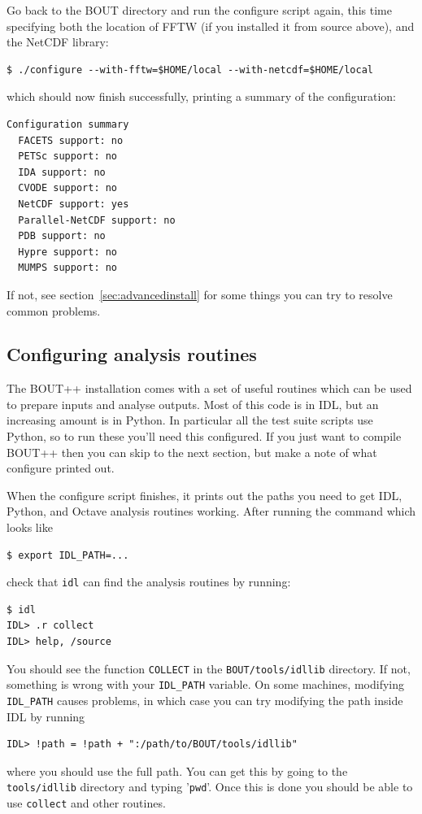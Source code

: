 \documentclass[12pt]{article}
\begin{document}
Go back to the BOUT directory and run the configure script again, 
this time specifying both the location of FFTW (if you installed it 
from source above), and the NetCDF library:
\begin{verbatim}
$ ./configure --with-fftw=$HOME/local --with-netcdf=$HOME/local
\end{verbatim}

which should now finish successfully, printing a summary of the configuration:
\begin{verbatim}
Configuration summary
  FACETS support: no
  PETSc support: no
  IDA support: no
  CVODE support: no
  NetCDF support: yes
  Parallel-NetCDF support: no
  PDB support: no
  Hypre support: no
  MUMPS support: no
\end{verbatim}

If not, see section~\ref{sec:advancedinstall} for some things you can
try to resolve common problems.

\subsection{Configuring analysis routines}
\label{sec:configanalysis}

The BOUT++ installation comes with a set of useful routines which can
be used to prepare inputs and analyse outputs. Most of this code
is in IDL, but an increasing amount is in Python. In particular all the
test suite scripts use Python, so to run these you'll need this configured.
If you just want to compile BOUT++ then you can skip to the next section, but make a note of what configure printed out. 

When the configure script finishes, it prints out the paths you need
to get IDL, Python, and Octave analysis routines working. After running
the  command which looks like
\begin{verbatim}
$ export IDL_PATH=...
\end{verbatim}
check that \texttt{idl} can find the analysis routines by running:
\begin{verbatim}
$ idl
IDL> .r collect
IDL> help, /source
\end{verbatim}
You should see the function \texttt{COLLECT} in the \texttt{BOUT/tools/idllib} directory. If not, something is wrong with your \texttt{IDL\_PATH} variable. On some machines, modifying \texttt{IDL\_PATH} causes problems, in which case you can try modifying the path inside IDL by running
\begin{verbatim}
IDL> !path = !path + ":/path/to/BOUT/tools/idllib"
\end{verbatim}
where you should use the full path. You can get this by going to the \texttt{tools/idllib} directory and typing '\texttt{pwd}'. Once this is done you should be able to use \texttt{collect} and other routines.
\end{document}
